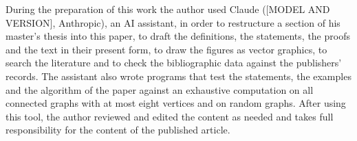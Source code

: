 During the preparation of this work the author used Claude ([MODEL AND VERSION], Anthropic), an AI assistant, in order to restructure a section of his master's thesis into this paper, to draft the definitions, the statements, the proofs and the text in their present form, to draw the figures as vector graphics, to search the literature and to check the bibliographic data against the publishers' records.
The assistant also wrote programs that test the statements, the examples and the algorithm of the paper against an exhaustive computation on all connected graphs with at most eight vertices and on random graphs.
After using this tool, the author reviewed and edited the content as needed and takes full responsibility for the content of the published article.
